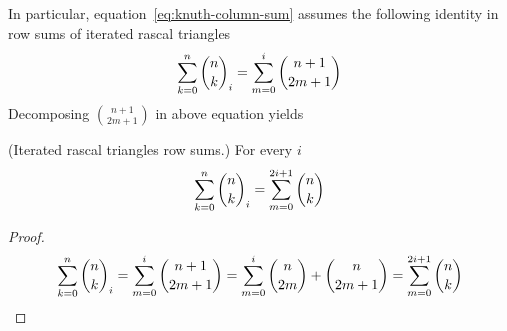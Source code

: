 In particular, equation~\eqref{eq:knuth-column-sum} assumes the following identity in
row sums of iterated rascal triangles
\begin{align*}
    \sum_{k=0}^n \binom{n}{k}_{i} = \sum_{m=0}^{i} \binom{n+1}{2m+1}
\end{align*}
Decomposing $\binom{n+1}{2m+1}$ in above equation yields
\begin{proposition} (Iterated rascal triangles row sums.)
    For every $i$
    \begin{align*}
        \sum_{k=0}^{n} \binom{n}{k}_{i} = \sum_{m=0}^{2i+1} \binom{n}{k}
    \end{align*}
    \begin{proof}
        \begin{align*}
            \sum_{k=0}^n \binom{n}{k}_{i} = \sum_{m=0}^{i} \binom{n+1}{2m+1} = \sum_{m=0}^{i} \binom{n}{2m} + \binom{n}{2m+1} = \sum_{m=0}^{2i+1} \binom{n}{k}
        \end{align*}
    \end{proof}
\end{proposition}
